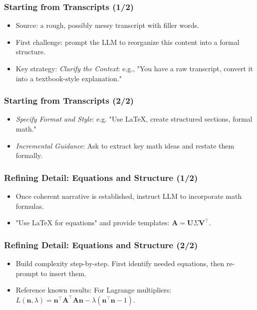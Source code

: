 \documentclass[aspectratio=169]{beamer}
\begin{document}
\begin{frame}
\frametitle{Starting from Transcripts (1/2)}
\begin{itemize}[<+->]
\item Source: a rough, possibly messy transcript with filler words.
\item First challenge: prompt the LLM to reorganize this content into a formal structure.
\item Key strategy: \emph{Clarify the Context}: e.g., "You have a raw transcript, convert it into a textbook-style explanation."
\end{itemize}
\end{frame}

\begin{frame}
\frametitle{Starting from Transcripts (2/2)}
\begin{itemize}[<+->]
\item \emph{Specify Format and Style}: e.g. "Use LaTeX, create structured sections, formal math."
\item \emph{Incremental Guidance}: Ask to extract key math ideas and restate them formally.
\end{itemize}
\end{frame}

\begin{frame}
\frametitle{Refining Detail: Equations and Structure (1/2)}
\begin{itemize}[<+->]
\item Once coherent narrative is established, instruct LLM to incorporate math formulas.
\item "Use LaTeX for equations" and provide templates: $\mathbf{A} = \mathbf{U}\Sigma\mathbf{V}^\top$.
\end{itemize}
\end{frame}

\begin{frame}
\frametitle{Refining Detail: Equations and Structure (2/2)}
\begin{itemize}[<+->]
\item Build complexity step-by-step. First identify needed equations, then re-prompt to insert them.
\item Reference known results: For Lagrange multipliers: $L(\mathbf{n},\lambda) = \mathbf{n}^\top\mathbf{A}^\top\mathbf{A}\mathbf{n}-\lambda(\mathbf{n}^\top\mathbf{n}-1)$.
\end{itemize}
\end{frame}
\end{document}
